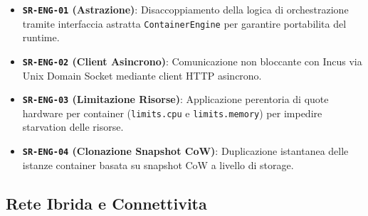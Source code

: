 \begin{itemize}
\tightlist
\item
  \textbf{\passthrough{\lstinline!SR-ENG-01!} (Astrazione)}:
  Disaccoppiamento della logica di orchestrazione tramite interfaccia
  astratta \passthrough{\lstinline!ContainerEngine!} per garantire
  portabilita del runtime.
\item
  \textbf{\passthrough{\lstinline!SR-ENG-02!} (Client Asincrono)}:
  Comunicazione non bloccante con Incus via Unix Domain Socket mediante
  client HTTP asincrono.
\item
  \textbf{\passthrough{\lstinline!SR-ENG-03!} (Limitazione Risorse)}:
  Applicazione perentoria di quote hardware per container
  (\passthrough{\lstinline!limits.cpu!} e
  \passthrough{\lstinline!limits.memory!}) per impedire starvation delle
  risorse.
\item
  \textbf{\passthrough{\lstinline!SR-ENG-04!} (Clonazione Snapshot
  CoW)}: Duplicazione istantanea delle istanze container basata su
  snapshot CoW a livello di storage.
\end{itemize}

\subsection{Rete Ibrida e
Connettivita}\label{rete-ibrida-e-connettivita}

